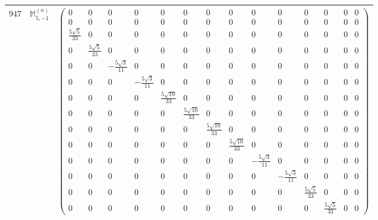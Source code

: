 \documentclass[fleqn,8pt,landscape]{jsarticle}
\begin{document}
\begin{center}
\begin{longtable}{ccc}
$ 947 $ & $ \mathbb{M}_{5,-1}^{(a)} $ & $ \begin{pmatrix} 0 & 0 & 0 & 0 & 0 & 0 & 0 & 0 & 0 & 0 & 0 & 0 & 0 & 0 \\ 0 & 0 & 0 & 0 & 0 & 0 & 0 & 0 & 0 & 0 & 0 & 0 & 0 & 0 \\ \frac{5 \sqrt{5}}{33} & 0 & 0 & 0 & 0 & 0 & 0 & 0 & 0 & 0 & 0 & 0 & 0 & 0 \\ 0 & \frac{5 \sqrt{5}}{33} & 0 & 0 & 0 & 0 & 0 & 0 & 0 & 0 & 0 & 0 & 0 & 0 \\ 0 & 0 & - \frac{5 \sqrt{3}}{11} & 0 & 0 & 0 & 0 & 0 & 0 & 0 & 0 & 0 & 0 & 0 \\ 0 & 0 & 0 & - \frac{5 \sqrt{3}}{11} & 0 & 0 & 0 & 0 & 0 & 0 & 0 & 0 & 0 & 0 \\ 0 & 0 & 0 & 0 & \frac{5 \sqrt{10}}{33} & 0 & 0 & 0 & 0 & 0 & 0 & 0 & 0 & 0 \\ 0 & 0 & 0 & 0 & 0 & \frac{5 \sqrt{10}}{33} & 0 & 0 & 0 & 0 & 0 & 0 & 0 & 0 \\ 0 & 0 & 0 & 0 & 0 & 0 & \frac{5 \sqrt{10}}{33} & 0 & 0 & 0 & 0 & 0 & 0 & 0 \\ 0 & 0 & 0 & 0 & 0 & 0 & 0 & \frac{5 \sqrt{10}}{33} & 0 & 0 & 0 & 0 & 0 & 0 \\ 0 & 0 & 0 & 0 & 0 & 0 & 0 & 0 & - \frac{5 \sqrt{3}}{11} & 0 & 0 & 0 & 0 & 0 \\ 0 & 0 & 0 & 0 & 0 & 0 & 0 & 0 & 0 & - \frac{5 \sqrt{3}}{11} & 0 & 0 & 0 & 0 \\ 0 & 0 & 0 & 0 & 0 & 0 & 0 & 0 & 0 & 0 & \frac{5 \sqrt{5}}{33} & 0 & 0 & 0 \\ 0 & 0 & 0 & 0 & 0 & 0 & 0 & 0 & 0 & 0 & 0 & \frac{5 \sqrt{5}}{33} & 0 & 0 \end{pmatrix} $ \\ \hline

\end{longtable}
\end{center}
\end{document}
